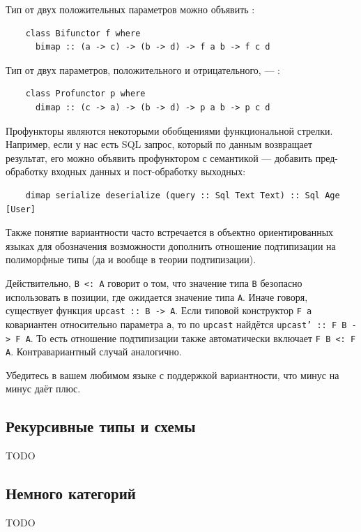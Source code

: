 Тип от двух положительных параметров можно объявить :
\begin{verbatim}
    class Bifunctor f where
      bimap :: (a -> c) -> (b -> d) -> f a b -> f c d
\end{verbatim}

Тип от двух параметров, положительного и отрицательного, --- :
\begin{verbatim}
    class Profunctor p where
      dimap :: (c -> a) -> (b -> d) -> p a b -> p c d
\end{verbatim}

Профункторы являются некоторыми обобщениями функциональной стрелки.
Например, если у нас есть SQL запрос, который по данным возвращает результат, его можно объявить профунктором с семантикой --- добавить пред-обработку входных данных и пост-обработку выходных:
\begin{verbatim}
    dimap serialize deserialize (query :: Sql Text Text) :: Sql Age [User]
\end{verbatim}

Также понятие вариантности часто встречается в объектно ориентированных языках для обозначения возможности дополнить отношение подтипизации на полиморфные типы (да и вообще в теории подтипизации).

Действительно,  \texttt{B <: A} говорит о том, что значение типа \texttt{B} безопасно использовать в позиции, где ожидается значение типа \texttt{A}.
Иначе говоря, существует функция \texttt{upcast :: B -> A}.
Если типовой конструктор \texttt{F a} ковариантен относительно параметра \texttt{a}, то по \texttt{upcast} найдётся \texttt{upcast' :: F B -> F A}.
То есть отношение подтипизации также автоматически включает \texttt{F B <: F A}.
Контравариантный случай аналогично.

\begin{task}
    Убедитесь в вашем любимом языке с поддержкой вариантности, что минус на минус даёт плюс.
\end{task}

\subsection{Рекурсивные типы и схемы} \label{subsec:recursive-types}

TODO %

\subsection{Немного категорий} \label{subsec:cats}

TODO %

